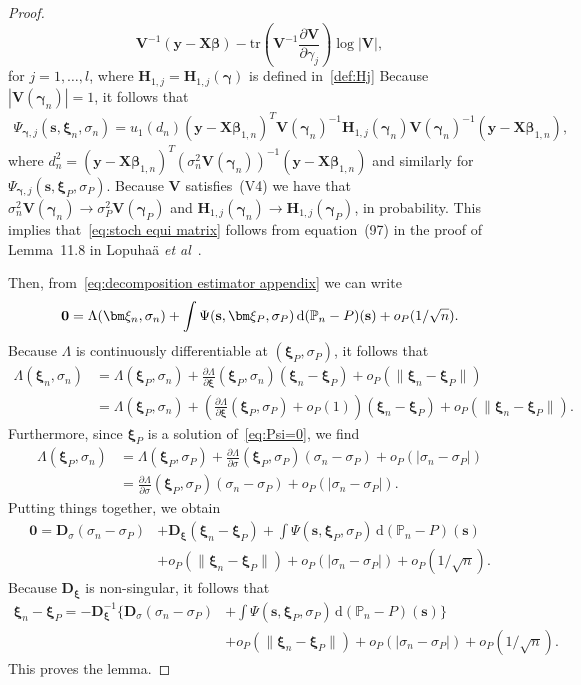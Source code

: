 \documentclass{article}
\numberwithin{equation}{section}
\theoremstyle{plain}
\newcommand{\dd}{\mathrm{d}}
\newcommand{\bbeta}{\bm\beta}
\newcommand{\bxi}{\bm\xi}
\newcommand{\bgamma}{\bm\gamma}
\newcommand{\by}{\mathbf{y}}
\newcommand{\bs}{\mathbf{s}}
\newcommand{\bX}{\mathbf{X}}
\newcommand{\bV}{\mathbf{V}}
\newcommand{\bD}{\mathbf{D}}
\newcommand{\bH}{\mathbf{H}}
\begin{document}
\begin{proof}
\[\bV^{-1}(\by-\bX\bbeta)
-
\mathrm{tr}\left(\bV^{-1}\frac{\partial \bV}{\partial \gamma_j}\right)\log|\bV|,
\]
for $j=1,\ldots,l$,
where $\bH_{1,j}=\bH_{1,j}(\bgamma)$ is defined in~\eqref{def:Hj}
Because $|\bV(\bgamma_n)|=1$, it follows that
\[
\begin{split}
\Psi_{\bgamma,j}(\bs,\bxi_n,\sigma_n)
=
u_1\left(d_n\right)
(\by-\bX\bbeta_{1,n})^T\bV(\bgamma_n)^{-1}
\bH_{1,j}(\bgamma_n)
\bV(\bgamma_n)^{-1}(\by-\bX\bbeta_{1,n}),
\end{split}
\]
where $d_n^2=(\by-\bX\bbeta_{1,n})^T(\sigma_n^2\bV(\bgamma_n))^{-1}(\by-\bX\bbeta_{1,n})$
and similarly for $\Psi_{\bgamma,j}(\bs,\bxi_P,\sigma_P)$.
Because $\bV$ satisfies~(V4) we have that $\sigma_n^2\bV(\bgamma_n)\to \sigma_P^2\bV(\bgamma_P)$ and 
$\bH_{1,j}(\bgamma_n)\to\bH_{1,j}(\bgamma_P)$, in probability.
This implies that~\eqref{eq:stoch equi matrix} follows from equation~(97) in the proof of Lemma~11.8 in Lopuha\"a \emph{et al}~\cite{supplement}.

Then, from~\eqref{eq:decomposition estimator appendix} we can write
\[
\mathbf{0}
=
\Lambda(\bxi_n,\sigma_n)
+
\int \Psi(\mathbf{s},\bxi_P,\sigma_P)\,\dd (\mathbb{P}_n-P)(\mathbf{s})\\
+
o_P(1/\sqrt{n}).
\]
Because $\Lambda$ is continuously differentiable at
$(\bxi_P,\sigma_P)$, it follows that
\[
\begin{split}
\Lambda(\bxi_n,\sigma_n)
&=
\Lambda(\bxi_P,\sigma_n)
+
\frac{\partial\Lambda}{\partial\bxi}(\bxi_P,\sigma_n)
(\bxi_n-\bxi_P)+
o_P(\|\bxi_n-\bxi_P\|)\\
&=
\Lambda(\bxi_P,\sigma_n)
+
\left(
\frac{\partial\Lambda}{\partial\bxi}(\bxi_P,\sigma_P)+o_P(1)
\right)
(\bxi_n-\bxi_P)+
o_P(\|\bxi_n-\bxi_P\|).
\end{split}
\]
Furthermore, since $\bxi_P$ is a solution of~\eqref{eq:Psi=0}, we find
\[
\begin{split}
\Lambda(\bxi_P,\sigma_n)
&=
\Lambda(\bxi_P,\sigma_P)
+
\frac{\partial\Lambda}{\partial\sigma}(\bxi_P,\sigma_P)(\sigma_n-\sigma_P)
+
o_P(|\sigma_n-\sigma_P|)\\
&=
\frac{\partial\Lambda}{\partial\sigma}(\bxi_P,\sigma_P)(\sigma_n-\sigma_P)
+
o_P(|\sigma_n-\sigma_P|).
\end{split}
\]
Putting things together, we obtain
\[
\begin{split}
\mathbf{0}
=
\bD_\sigma(\sigma_n-\sigma_P)
&+
\bD_{\bxi}(\bxi_n-\bxi_P)
+
\int \Psi(\mathbf{s},\bxi_P,\sigma_P)\,\dd (\mathbb{P}_n-P)(\mathbf{s})\\
&+
o_P(\|\bxi_n-\bxi_P\|)
+
o_P(|\sigma_n-\sigma_P|)
+
o_P(1/\sqrt{n}).
\end{split}
\]
Because $\bD_{\bxi}$ is non-singular, it follows that
\[
\begin{split}
\bxi_n-\bxi_P
=
-\bD_{\bxi}^{-1}
\bigg\{
\bD_\sigma(\sigma_n-\sigma_P)
&+
\int \Psi(\mathbf{s},\bxi_P,\sigma_P)\,\dd (\mathbb{P}_n-P)(\mathbf{s})
\bigg\}\\
&+
o_P(\|\bxi_n-\bxi_P\|)
+
o_P(|\sigma_n-\sigma_P|)
+
o_P(1/\sqrt{n}).
\end{split}
\]
This proves the lemma.
\end{proof}
\end{document}

